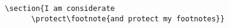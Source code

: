 \begin{code}
\verb|\section{I am considerate|\\
\verb|      \protect\footnote{and protect my footnotes}}|
\end{code}


